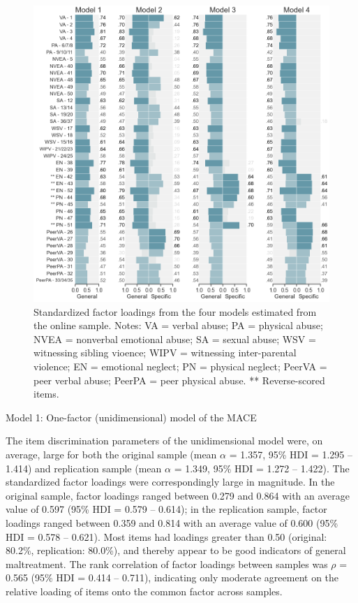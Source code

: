 \documentclass[letterpaper,man,natbib,floatsintext,longtable]{apa6}
\makeatletter
\renewcommand{\subsubsection}{\@startsection{subsubsection}{3}
  {\z@}%
  {\b@level@two@skip}{\e@level@two@skip}%
  {\normalfont\normalsize\bfseries}}
\makeatother
\begin{document}
\begin{figure}[h!]
    \centering
    \includegraphics[width=1.1\textwidth,center]{figures/fig03.png}
    \captionsetup{width=1.1\textwidth}
    \caption{Standardized factor loadings from the four models estimated from the online sample. Notes: VA = verbal abuse; PA = physical abuse; NVEA = nonverbal emotional abuse; SA = sexual abuse; WSV = witnessing sibling vioence; WIPV = witnessing inter-parental violence; EN = emotional neglect; PN = physical neglect; PeerVA = peer verbal abuse; PeerPA = peer physical abuse. ** Reverse-scored items.}
    \label{fig:loadings_online}
\end{figure}


\subsubsection{Model 1: One-factor (unidimensional) model of the MACE}

The item discrimination parameters of the unidimensional model were, on average, large for both the original sample (mean $\alpha$ = 1.357, 95\% HDI = 1.295 -- 1.414) and replication sample (mean $\alpha$ = 1.349, 95\% HDI = 1.272 -- 1.422). The standardized factor loadings were correspondingly large in magnitude. In the original sample, factor loadings ranged between 0.279 and 0.864 with an average value of 0.597 (95\% HDI = 0.579 -- 0.614); in the replication sample, factor loadings ranged between 0.359 and 0.814 with an average value of 0.600 (95\% HDI = 0.578 -- 0.621). Most items had loadings greater than 0.50 (original: 80.2\%, replication: 80.0\%), and thereby appear to be good indicators of general maltreatment. The rank correlation of factor loadings between samples was $\rho$ = 0.565 (95\% HDI = 0.414 -- 0.711), indicating only moderate agreement on the relative loading of items onto the common factor across samples. 
\end{document}
